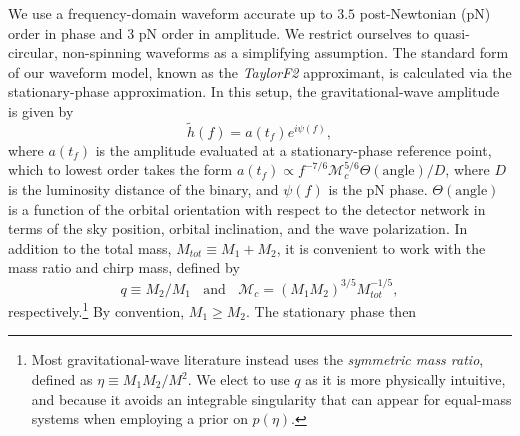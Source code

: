 \documentclass[11pt,a4paper]{emulateapj} 
\newcommand{\will}[1]{{\color{cyan} #1}}
\newcommand{\chmass}{\mathcal{M}_c}
\begin{document}
We use a frequency-domain waveform accurate up to $3.5$ post-Newtonian
(pN) order in phase and 3 pN order in amplitude.  We restrict
ourselves to quasi-circular, non-spinning waveforms as a simplifying
assumption.  The standard form of our waveform model, known as the
\textit{TaylorF2} approximant, is calculated via the stationary-phase
approximation.  In this setup, the gravitational-wave amplitude is
given by
\begin{equation}
\tilde{h}(f) = a(t_f) e^{i \psi(f)},
\label{amplitude}
\end{equation}
where $a(t_f)$ is the amplitude evaluated at a stationary-phase
reference point, which to lowest order takes the form $a(t_f) \propto
f^{-7/6} \chmass^{5/6}\Theta(\text{angle})/D$, where $D$ is the
luminosity distance of the binary, and $\psi(f)$ is the pN phase.
$\Theta(\text{angle})$ is a function of the orbital orientation with
respect to the detector network in terms of the sky position, orbital
inclination, and the wave polarization.  In addition to the total
mass, $M_{tot}\equiv M_1+M_2$, it is convenient to work with the mass
ratio and chirp mass, defined by
\begin{equation}
  q\equiv M_2/M_1~~~~\text{and}~~~~\chmass = (M_1 M_2)^{3/5}
  M_{tot}^{-1/5},
  \label{eqRatioCM}
\end{equation}
respectively.\footnote{Most gravitational-wave literature instead uses
  the \textit{symmetric mass ratio}, defined as $\eta \equiv M_1 M_2 /
  M^2$.  We elect to use $q$ as it is more physically intuitive, and
  because it avoids an integrable singularity that can appear for
  equal-mass systems when employing a prior on $p(\eta)$.  
    }  By convention, $M_1 \geq M_2$.  The stationary phase then
\end{document}
